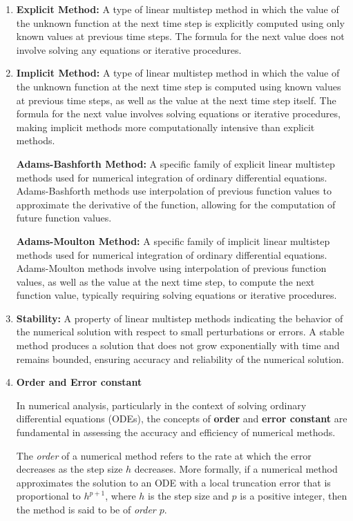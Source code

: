 \documentclass[a4paper, twoside]{report} %
\begin{document}
\begin{enumerate}
		\item \textbf{Explicit Method:} A type of linear multistep method in which the value of the unknown function at the next time step is explicitly computed using only known values at previous time steps. The formula for the next value does not involve solving any equations or iterative procedures.

		\item \textbf{Implicit Method:} A type of linear multistep method in which the value of the unknown function at the next time step is computed using known values at previous time steps, as well as the value at the next time step itself. The formula for the next value involves solving equations or iterative procedures, making implicit methods more computationally intensive than explicit methods.

		\subitem \textbf{Adams-Bashforth Method:} A specific family of explicit linear multistep methods used for numerical integration of ordinary differential equations. Adams-Bashforth methods use interpolation of previous function values to approximate the derivative of the function, allowing for the computation of future function values.

		\subitem \textbf{Adams-Moulton Method:} A specific family of implicit linear multistep methods used for numerical integration of ordinary differential equations. Adams-Moulton methods involve using interpolation of previous function values, as well as the value at the next time step, to compute the next function value, typically requiring solving equations or iterative procedures.

		\item \textbf{Stability:} A property of linear multistep methods indicating the behavior of the numerical solution with respect to small perturbations or errors. A stable method produces a solution that does not grow exponentially with time and remains bounded, ensuring accuracy and reliability of the numerical solution.

		\item \textbf{Order and Error constant}

		In numerical analysis, particularly in the context of solving ordinary differential equations (ODEs), the concepts of \textbf{order} and \textbf{error constant} are fundamental in assessing the accuracy and efficiency of numerical methods.


		The \textit{order} of a numerical method refers to the rate at which the error decreases as the step size \( h \) decreases. More formally, if a numerical method approximates the solution to an ODE with a local truncation error that is proportional to \( h^{p+1} \), where \( h \) is the step size and \( p \) is a positive integer, then the method is said to be of \textit{order \( p \)}.


\end{enumerate}
\end{document}
